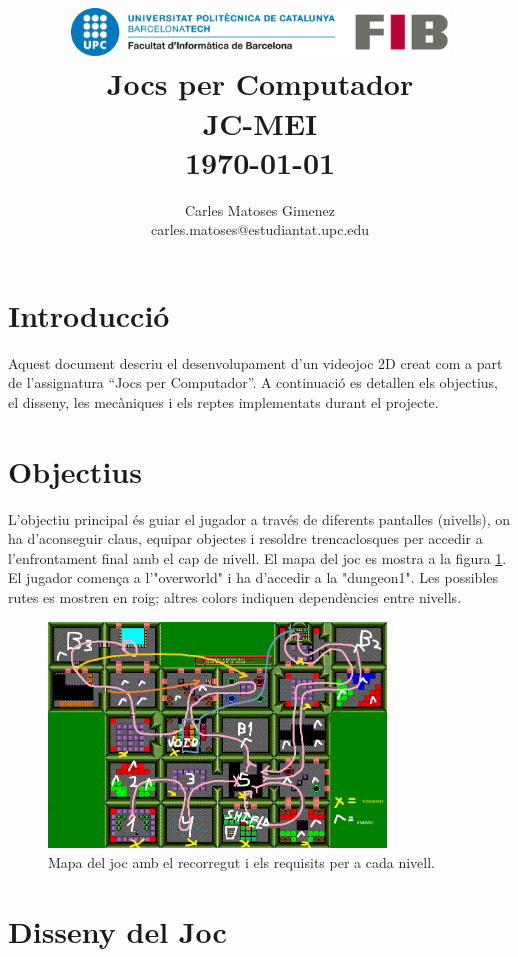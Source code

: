 \documentclass[a4paper,12pt]{article}
\title{
    \vspace{2cm}
    \includegraphics[width=0.75\textwidth]{fib.png} \\
    \vspace{1cm}
    \textbf{\Huge Jocs per Computador} \\
    \vspace{1cm}
    \large JC-MEI \\
    \vspace{0.5cm}
    \large \today
}
\author{
Carles Matoses Gimenez\\
\small carles.matoses@estudiantat.upc.edu
}
\date{}
\begin{document}
\maketitle
\thispagestyle{empty}
\newpage

\setcounter{page}{1}
\tableofcontents
\newpage

\section{Introducció}
Aquest document descriu el desenvolupament d'un videojoc 2D creat com a part de l'assignatura “Jocs per Computador”. A continuació es detallen els objectius, el disseny, les mecàniques i els reptes implementats durant el projecte.

\section{Objectius}
L'objectiu principal és guiar el jugador a través de diferents pantalles (nivells), on ha d'aconseguir claus, equipar objectes i resoldre trencaclosques per accedir a l'enfrontament final amb el cap de nivell. El mapa del joc es mostra a la figura \ref{fig:mapa}. El jugador comença a l'"overworld" i ha d'accedir a la "dungeon1". Les possibles rutes es mostren en roig; altres colors indiquen dependències entre nivells.

\begin{figure}[ht!]
    \centering
    \includegraphics[width=0.8\textwidth]{../imgs/recorregut.png}
    \caption{Mapa del joc amb el recorregut i els requisits per a cada nivell.}
    \label{fig:mapa}
\end{figure}

\section{Disseny del Joc}
\end{document}
